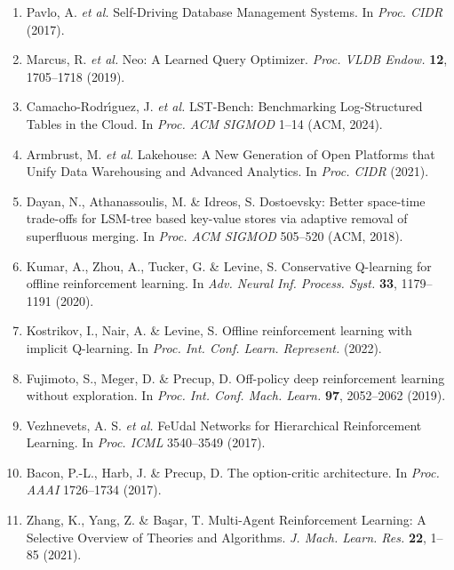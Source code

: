 \documentclass[fleqn,10pt]{wlscirep}
\begin{document}
\begin{enumerate}
\item Pavlo, A. \textit{et al.} Self-Driving Database Management Systems.
  In \textit{Proc. CIDR} (2017).

\item Marcus, R. \textit{et al.} Neo: A Learned Query Optimizer.
  \textit{Proc. VLDB Endow.} \textbf{12}, 1705--1718 (2019).

\item Camacho-Rodr\'{\i}guez, J. \textit{et al.} LST-Bench: Benchmarking
  Log-Structured Tables in the Cloud. In \textit{Proc. ACM SIGMOD}
  1--14 (ACM, 2024).

\item Armbrust, M. \textit{et al.} Lakehouse: A New Generation of Open
  Platforms that Unify Data Warehousing and Advanced Analytics. In
  \textit{Proc. CIDR} (2021).

\item Dayan, N., Athanassoulis, M. \& Idreos, S. Dostoevsky: Better
  space-time trade-offs for LSM-tree based key-value stores via adaptive
  removal of superfluous merging. In \textit{Proc. ACM SIGMOD} 505--520
  (ACM, 2018).

\item Kumar, A., Zhou, A., Tucker, G. \& Levine, S. Conservative
  Q-learning for offline reinforcement learning. In \textit{Adv. Neural
  Inf. Process. Syst.} \textbf{33}, 1179--1191 (2020).

\item Kostrikov, I., Nair, A. \& Levine, S. Offline reinforcement
  learning with implicit Q-learning. In \textit{Proc. Int. Conf. Learn.
  Represent.} (2022).

\item Fujimoto, S., Meger, D. \& Precup, D. Off-policy deep
  reinforcement learning without exploration. In \textit{Proc. Int.
  Conf. Mach. Learn.} \textbf{97}, 2052--2062 (2019).

\item Vezhnevets, A. S. \textit{et al.} FeUdal Networks for Hierarchical
  Reinforcement Learning. In \textit{Proc. ICML} 3540--3549 (2017).

\item Bacon, P.-L., Harb, J. \& Precup, D. The option-critic
  architecture. In \textit{Proc. AAAI} 1726--1734 (2017).

\item Zhang, K., Yang, Z. \& Ba\c{s}ar, T. Multi-Agent Reinforcement
  Learning: A Selective Overview of Theories and Algorithms.
  \textit{J. Mach. Learn. Res.} \textbf{22}, 1--85 (2021).


\end{enumerate}
\end{document}
